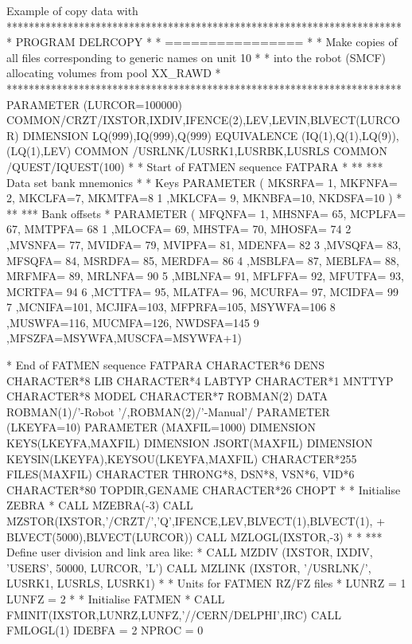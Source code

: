\begin{XMPt}{Example of copy data with \protect{}}
***********************************************************************
* PROGRAM DELRCOPY                                                    *
* ================                                                    *
* Make copies of all files corresponding to generic names on unit 10  *
* into the robot (SMCF) allocating volumes from pool XX_RAWD          *
***********************************************************************
      PARAMETER (LURCOR=100000)
      COMMON/CRZT/IXSTOR,IXDIV,IFENCE(2),LEV,LEVIN,BLVECT(LURCOR)
      DIMENSION    LQ(999),IQ(999),Q(999)
      EQUIVALENCE (IQ(1),Q(1),LQ(9)),(LQ(1),LEV)
      COMMON /USRLNK/LUSRK1,LUSRBK,LUSRLS
      COMMON /QUEST/IQUEST(100)
*
* Start of FATMEN sequence FATPARA
*
** ***     Data set bank mnemonics
*
*          Keys
      PARAMETER ( MKSRFA= 1, MKFNFA= 2, MKCLFA=7, MKMTFA=8
     1           ,MKLCFA= 9, MKNBFA=10, NKDSFA=10 )
*
** ***     Bank offsets
*
      PARAMETER ( MFQNFA=  1, MHSNFA= 65, MCPLFA= 67, MMTPFA= 68
     1           ,MLOCFA= 69, MHSTFA= 70, MHOSFA= 74
     2           ,MVSNFA= 77, MVIDFA= 79, MVIPFA= 81, MDENFA= 82
     3           ,MVSQFA= 83, MFSQFA= 84, MSRDFA= 85, MERDFA= 86
     4           ,MSBLFA= 87, MEBLFA= 88, MRFMFA= 89, MRLNFA= 90
     5           ,MBLNFA= 91, MFLFFA= 92, MFUTFA= 93, MCRTFA= 94
     6           ,MCTTFA= 95, MLATFA= 96, MCURFA= 97, MCIDFA= 99
     7           ,MCNIFA=101, MCJIFA=103, MFPRFA=105, MSYWFA=106
     8           ,MUSWFA=116, MUCMFA=126, NWDSFA=145
     9           ,MFSZFA=MSYWFA,MUSCFA=MSYWFA+1)
 
* End of FATMEN sequence FATPARA
      CHARACTER*6  DENS
      CHARACTER*8  LIB
      CHARACTER*4  LABTYP
      CHARACTER*1  MNTTYP
      CHARACTER*8  MODEL
      CHARACTER*7  ROBMAN(2)
      DATA         ROBMAN(1)/'-Robot '/,ROBMAN(2)/'-Manual'/
      PARAMETER (LKEYFA=10)
      PARAMETER (MAXFIL=1000)
      DIMENSION KEYS(LKEYFA,MAXFIL)
      DIMENSION JSORT(MAXFIL)
      DIMENSION KEYSIN(LKEYFA),KEYSOU(LKEYFA,MAXFIL)
      CHARACTER*255 FILES(MAXFIL)
      CHARACTER     THRONG*8, DSN*8, VSN*6, VID*6
      CHARACTER*80  TOPDIR,GENAME
      CHARACTER*26  CHOPT
*
*     Initialise ZEBRA
*
      CALL MZEBRA(-3)
      CALL MZSTOR(IXSTOR,'/CRZT/','Q',IFENCE,LEV,BLVECT(1),BLVECT(1),
     +            BLVECT(5000),BLVECT(LURCOR))
      CALL MZLOGL(IXSTOR,-3)
*
* *** Define user division and link area like:
*
      CALL MZDIV  (IXSTOR, IXDIV, 'USERS', 50000, LURCOR, 'L')
      CALL MZLINK (IXSTOR, '/USRLNK/', LUSRK1, LUSRLS, LUSRK1)
*
*     Units for FATMEN RZ/FZ files
*
      LUNRZ = 1
      LUNFZ = 2
*
*     Initialise FATMEN
*
      CALL FMINIT(IXSTOR,LUNRZ,LUNFZ,'//CERN/DELPHI',IRC)
      CALL FMLOGL(1)
      IDEBFA = 2
      NPROC  = 0
 

\end{XMPt}
